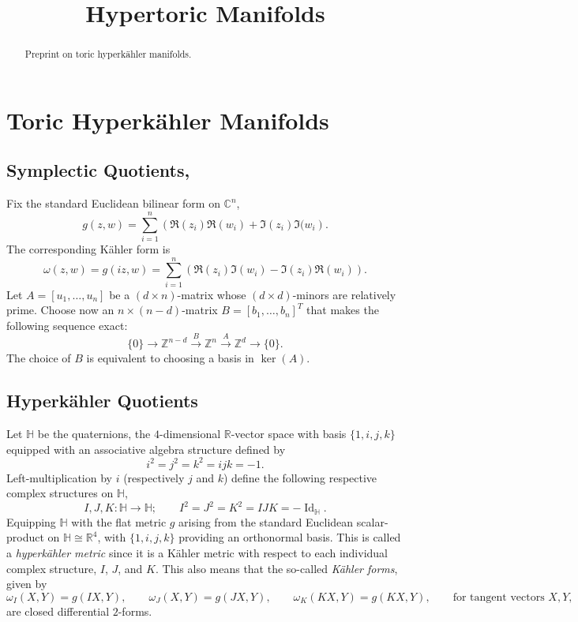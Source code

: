 \documentclass{article}
\title{Hypertoric Manifolds}
\date{}	%
\newcommand{\lra}{\longrightarrow}
\newcommand{\lbracket}{\left(}
\newcommand{\rbracket}{\right)}
\newcommand{\w}{\omega}
\newcommand{\kahler}{K\"ahler }
\newcommand{\hyperkahler}{hyperk\"ahler }
\newcommand{\RR}{\mathbb{R}}
\newcommand{\CC}{\mathbb{C}}
\newcommand{\ZZ}{\mathbb{Z}}
\newcommand{\HH}{\mathbb{H}}
\DeclareMathOperator{\Id}{Id}
\begin{document}
	\maketitle
	
	\begin{abstract}
		Preprint on toric \hyperkahler manifolds.
	\end{abstract}

	\section{Toric Hyperk{\"a}hler Manifolds}
	
	\subsection{Symplectic Quotients, \cite{Hausel2002}}

	Fix the standard Euclidean bilinear form on $\CC^{n}$,
	\[
		g(z,w) = \sum_{i = 1}^{n}\lbracket \Re(z_{i})\Re(w_{i}) + \Im(z_{i})\Im(w_{i} \rbracket.
	\]
	The corresponding \kahler form is
	\[
		\w(z,w) = g(iz,w) = \sum_{i = 1}^{n} \lbracket \Re(z_{i}) \Im(w_{i}) - \Im(z_{i}) \Re(w_{i}) \rbracket.
	\]
	Let $A = [u_{1}, \ldots, u_{n}]$ be a $(d \times n)$-matrix whose $(d \times d)$-minors are relatively prime. Choose now an $n \times (n - d)$-matrix $B = [b_{1}, \ldots, b_{n}]^{T}$ that makes the following sequence exact:
	\[
		\{0\} \lra \ZZ^{n-d} \overset{B}{\lra} \ZZ^{n} \overset{A}{\lra} \ZZ^{d} \lra \{0\}.
	\]
	The choice of $B$ is equivalent to choosing a basis in $\ker(A)$.
	
	\subsection{Hyperk{\"a}hler Quotients}
	
	Let $\HH$ be the quaternions, the $4$-dimensional $\RR$-vector space with basis $\{1, i, j, k\}$ equipped with an associative algebra structure defined by
	\[
		i^{2} = j^{2} = k^{2} = ijk = -1.
	\]
	Left-multiplication by $i$ (respectively $j$ and $k$) define the following respective complex structures on $\HH$,
	\[
		I, J, K : \HH \lra \HH; \qquad I^{2} = J^{2} = K^{2} = IJK = -\Id_{\HH}.
	\]
	Equipping $\HH$ with the flat metric $g$ arising from the standard Euclidean scalar-product on $\HH \cong \RR^{4}$, with $\{1,i,j,k\}$ providing an orthonormal basis. This is called a \emph{\hyperkahler metric} since it is a \kahler metric with respect to each individual complex structure, $I$, $J$, and $K$. This also means that the so-called \emph{\kahler forms}, given by
	\[
		\w_{I}(X,Y) = g(IX, Y), \qquad \w_{J}(X,Y) = g(JX, Y), \qquad \w_{K}(KX,Y) = g(KX,Y), \qquad \text{for tangent vectors } X, Y,
	\]
	are closed differential $2$-forms.
	
\end{document}
